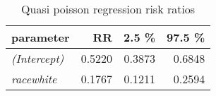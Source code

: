 \begin{wraptable}{r}{2in}

\caption{\label{tab:quasipoisson_reg_RR}Quasi poisson regression risk ratios}
\centering
\fontsize{9}{11}\selectfont
\begin{tabular}[t]{>{}lrrr}
\toprule
parameter & RR & 2.5 \% & 97.5 \%\\
\midrule
\em{(Intercept)} & 0.5220 & 0.3873 & 0.6848\\
\em{racewhite} & 0.1767 & 0.1211 & 0.2594\\
\bottomrule
\end{tabular}
\end{wraptable}
